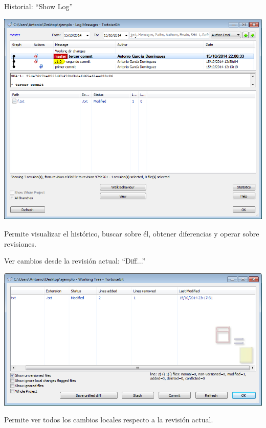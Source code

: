 \documentclass[xcolor=svgnames]{beamer}
\begin{document}
\begin{frame}{Historial: ``Show Log''}
  \begin{center}
    \includegraphics[width=\textwidth,height=.7\textheight,keepaspectratio]{tomas/showlog.png}
  \end{center}

  Permite visualizar el histórico, buscar sobre él, obtener
  diferencias y operar sobre revisiones.
\end{frame}

\begin{frame}{Ver cambios desde la revisión actual: ``Diff...''}
  \begin{center}
    \includegraphics[width=\textwidth,height=.7\textheight,keepaspectratio]{tomas/diff.png}
  \end{center}

  Permite ver todos los cambios locales respecto a la revisión actual.
\end{frame}
\end{document}
